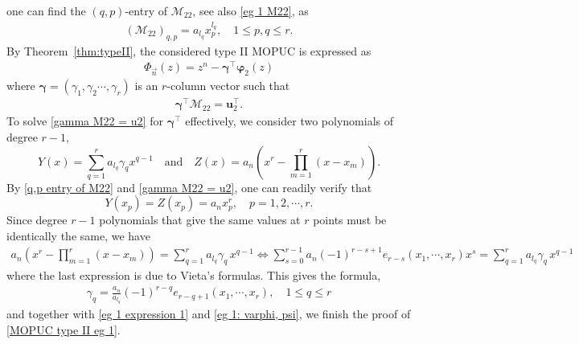 \documentclass[a4paper,10pt,leqno]{amsart}
\numberwithin{equation}{section}
\theoremstyle{remark}
\begin{document}
one can find the $(q, p)$-entry of $\bm{\mathcal{M}}_{22}$, see also \eqref{eg 1 M22}, as 
\begin{align} \label{q,p entry of M22}
\left( \bm{\mathcal{M}}_{22} \right)_{q,p} = a_{l_q} x_p^{l_q}, \quad 1 \leq p, q \leq r.
\end{align}
By Theorem~\ref{thm:typeII}, the considered type II MOPUC is expressed as
\begin{align} \label{eg 1 expression 1}
\Phi_{\vec{n}}(z) = z^n - \bm{\gamma}^\top \bm{\varphi}_2(z)
\end{align}
where $\bm \gamma = (\gamma_1, \gamma_2 \cdots, \gamma_r)$ is an $r$-column vector such that 
\begin{align} \label{gamma M22 = u2}
\bm \gamma^\top \bm{\mathcal{M}}_{22} = \boldsymbol{u}_2^\top.
\end{align}
To solve \eqref{gamma M22 = u2} for $\bm \gamma^\top$ effectively, we consider two polynomials of degree $r-1$,
\[
Y(x) = \sum_{q=1}^r a_{l_q} \gamma_q x^{q-1} \quad \text{and} \quad Z(x) = a_n \left( x^r - \prod_{m=1}^r (x - x_m) \right).
\]
By \eqref{q,p entry of M22} and \eqref{gamma M22 = u2}, one can readily verify that
\[
Y(x_p) = Z(x_p) = a_n x_p^r, \quad p = 1, 2, \cdots, r.
\]
Since degree $r-1$ polynomials that give the same values at $r$ points must be identically the same, we have
\begin{align}
    a_n \left( x^r - \prod_{m=1}^r (x - x_m) \right) = \sum_{q=1}^r a_{l_q} \gamma_q \, x^{q-1} \iff \sum_{s=0}^{r-1} a_n (-1)^{r-s+1} e_{r-s}(x_1, \cdots, x_r) x^s = \sum_{q=1}^r a_{l_q} \gamma_q \, x^{q-1}
\end{align}
where the last expression is due to Vieta's formulas. This gives the formula,
\begin{align} \label{gamma q formula}
    \gamma_q = \frac{a_n}{a_{l_q}}(-1)^{r-q} e_{r-q+1}(x_1, \cdots, x_r), \quad 1 \leq q \leq r
\end{align}
and together with \eqref{eg 1 expression 1} and \eqref{eg 1: varphi, psi}, we finish the proof of \eqref{MOPUC type II eg 1}.
\end{document}
